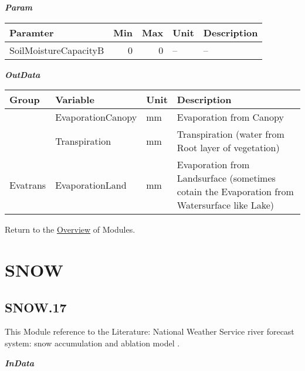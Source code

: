\documentclass[
]{book}
\begin{document}
\textbf{\emph{Param}}

\begin{table}[!h]
\centering
\begin{tabular}{l|r|r|l|l}
\hline
Paramter & Min & Max & Unit & Description\\
\hline
SoilMoistureCapacityB & 0 & 0 & -- & --\\
\hline
\end{tabular}
\end{table}

\textbf{\emph{OutData}}

\begin{table}[!h]
\centering
\begin{tabular}{l|l|l|l}
\hline
Group & Variable & Unit & Description\\
\hline
 & EvaporationCanopy & mm & Evaporation from Canopy\\
\cline{2-4}
 & Transpiration & mm & Transpiration (water from Root layer of vegetation)\\
\cline{2-4}
\multirow{-3}{*}{\raggedright\arraybackslash Evatrans} & EvaporationLand & mm & Evaporation from Landsurface (sometimes cotain the Evaporation from Watersurface like Lake)\\
\hline
\end{tabular}
\end{table}

Return to the \protect\hyperlink{module}{Overview} of Modules.

\hypertarget{SNOW}{%
\section{SNOW}\label{SNOW}}

\hypertarget{SNOW.17}{%
\subsection{SNOW.17}\label{SNOW.17}}

This Module reference to the Literature: National Weather Service river forecast system: snow accumulation and ablation model \citep{Anderson.1973}.

\textbf{\emph{InData}}
\end{document}

